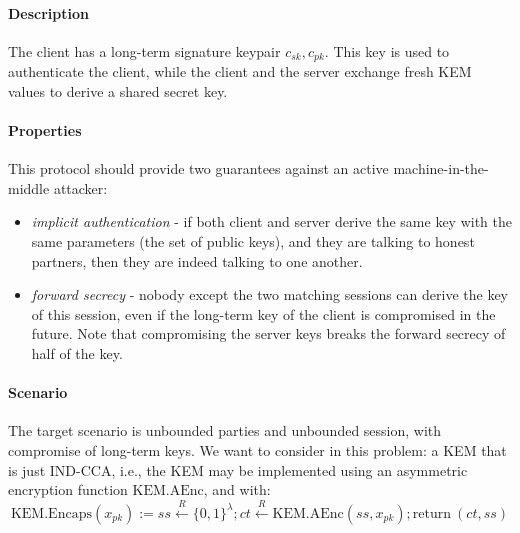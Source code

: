 \documentclass[11pt]{article}
\newcommand{\store}{\leftarrow}
\newcommand{\getR}{\stackrel{R}{\store}}
\newcommand{\sfsk}{\mathit{sk}}
\newcommand{\sfpk}{\mathit{pk}}
\newcommand{\sfss}{\mathit{ss}}
\newcommand{\sfct}{\mathit{ct}}
\newcommand{\kwf}[1]{\mathrm{#1}}
\newcommand{\encaps}{\kwf{KEM.Encaps}}
\newcommand{\aenckem}{\kwf{KEM.AEnc}}
\newcommand{\return}{\kwf{return}}
\begin{document}
 \paragraph{Description} The client has a long-term signature keypair $c_\sfsk,c_\sfpk$.
This key is used to authenticate the client, while the client and the server exchange fresh KEM values to derive a shared secret key.

\paragraph{Properties} This protocol should provide two guarantees against an active machine-in-the-middle attacker:
\begin{itemize}
\item \emph{implicit authentication} -  if both client and server derive the same key with the same parameters (the set of public keys), and they are talking to honest partners, then they are indeed talking to one another.
\item \emph{forward secrecy} - nobody except the two matching sessions can derive the key of this session, even if the long-term key of the client is compromised in the future. Note that compromising the server keys breaks the forward secrecy of half of the key.
\end{itemize}

\paragraph{Scenario} The target scenario is unbounded parties and unbounded session, with compromise of long-term keys.
We want to consider in this problem: a KEM that is just IND-CCA, i.e., the KEM may be implemented using an asymmetric encryption function $\aenckem$, and with:
$$\encaps(x_\sfpk) := \sfss \getR \{0,1\}^\lambda; \sfct \getR \aenckem(\sfss,x_\sfpk); \return~(\sfct,\sfss)  $$
\end{document}
